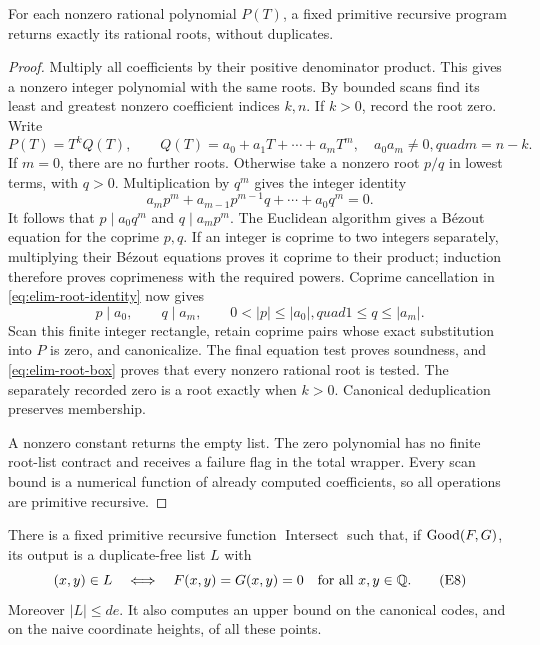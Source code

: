 \begin{lemma}
\label{lem:elim-rational-roots}
For each nonzero rational polynomial \(P(T)\), a fixed primitive
recursive program returns exactly its rational roots, without duplicates.
\end{lemma}

\begin{proof}
Multiply all coefficients by their positive denominator product.  This
gives a nonzero integer polynomial with the same roots.  By bounded scans
find its least and greatest nonzero coefficient indices \(k,n\).  If
\(k>0\), record the root zero.  Write
\[
 P(T)=T^kQ(T),\qquad
 Q(T)=a_0+a_1T+\cdots+a_mT^m,
 \quad a_0a_m\ne0,quad m=n-k.
\]
If \(m=0\), there are no further roots.  Otherwise take a nonzero root
\(p/q\) in lowest terms, with \(q>0\).  Multiplication by \(q^m\)
gives the integer identity
\[
 a_mp^m+a_{m-1}p^{m-1}q+\cdots+a_0q^m=0.
 \tag{E6}\label{eq:elim-root-identity}
\]
It follows that \(p\mid a_0q^m\) and \(q\mid a_mp^m\).
The Euclidean algorithm gives a B\'ezout equation for the coprime
\(p,q\).  If an integer is coprime to two integers separately, multiplying
their B\'ezout equations proves it coprime to their product; induction
therefore proves coprimeness with the required powers.  Coprime
cancellation in \eqref{eq:elim-root-identity} now gives
\[
 p\mid a_0,\qquad q\mid a_m,
 \qquad 0<|p|\le|a_0|,quad 1\le q\le|a_m|.
 \tag{E7}\label{eq:elim-root-box}
\]
Scan this finite integer rectangle, retain coprime pairs whose exact
substitution into \(P\) is zero, and canonicalize.  The final equation
test proves soundness, and \eqref{eq:elim-root-box} proves that every
nonzero rational root is tested.  The separately recorded zero is a root
exactly when \(k>0\).  Canonical deduplication preserves membership.

A nonzero constant returns the empty list.  The zero polynomial has no
finite root-list contract and receives a failure flag in the total
wrapper.  Every scan bound is a numerical function of already computed
coefficients, so all operations are primitive recursive.
\end{proof}

\begin{theorem}
\label{thm:elim-complete}
There is a fixed primitive recursive function \(\operatorname{Intersect}\)
such that, if \(\operatorname{Good}(F,G)\), its output is a duplicate-free list \(L\)
with
\[
 (x,y)\in L\quad\Longleftrightarrow\quad F(x,y)=G(x,y)=0
 \quad\text{for all }x,y\in\mathbb Q.
 \tag{E8}\label{eq:elim-complete}
\]
Moreover \(|L|\le de\).  It also computes an upper bound on the canonical
codes, and on the naive coordinate heights, of all these points.
\end{theorem}

